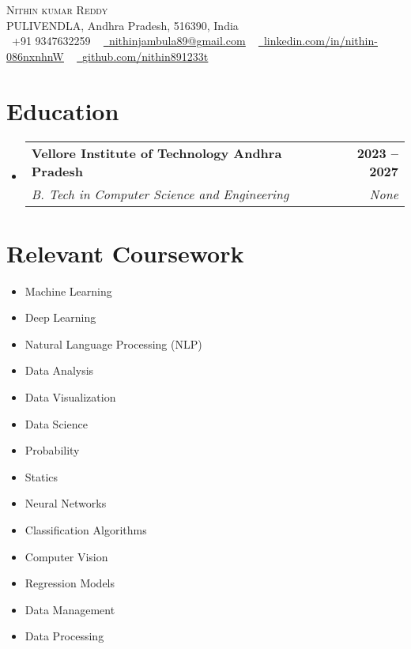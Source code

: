 \documentclass[letterpaper,11pt]{article}
\makeatletter
\newcommand{\resumeSubheading}[4]{
  \vspace{-2pt}\item
    \begin{tabular*}{1.0\textwidth}[t]{l@{\extracolsep{\fill}}r}
      \textbf{#1} & \textbf{\small #2} \\
      \textit{\small#3} & \textit{\small #4} \\
    \end{tabular*}\vspace{-7pt}
}
\newcommand{\resumeSubHeadingListStart}{\begin{itemize}[leftmargin=0.0in, label={}]}
\newcommand{\resumeSubHeadingListEnd}{\end{itemize}}
\makeatother
\begin{document}
\begin{center}
    {\Huge \scshape Nithin kumar Reddy} \\ \vspace{1pt}
    PULIVENDLA, Andhra Pradesh, 516390, India \\ \vspace{1pt}
    \small \raisebox{-0.1\height}\faPhone\ +91 9347632259 ~ \href{mailto:nithinjambula89@gmail.com}{\raisebox{-0.2\height}\faEnvelope\  \underline{nithinjambula89@gmail.com}} ~ 
    \href{https://www.linkedin.com/in/nithin-086nxnhnW}{\raisebox{-0.2\height}\faLinkedin\ \underline{linkedin.com/in/nithin-086nxnhnW}}  ~
    \href{https://github.com/nithin891233t}{\raisebox{-0.2\height}\faGithub\ \underline{github.com/nithin891233t}}
    \vspace{-8pt}
\end{center}

\section{Education}
  \resumeSubHeadingListStart
    \resumeSubheading
      {Vellore Institute of Technology Andhra Pradesh}{2023 -- 2027}
      {B. Tech in Computer Science and Engineering}{None}
  \resumeSubHeadingListEnd



\section{Relevant Coursework}
    \begin{multicols}{4}
        \begin{itemize}[itemsep=-5pt, parsep=3pt]
            \item\small Machine Learning
            \item\small Deep Learning
            \item\small Natural Language Processing (NLP)
            \item\small Data Analysis
            \item\small Data Visualization
            \item\small Data Science
            \item\small Probability
            \item\small Statics
            \item\small Neural Networks
            \item\small Classification Algorithms
            \item\small Computer Vision
            \item\small Regression Models
            \item\small Data Management
            \item\small Data Processing
        \end{itemize}
    \end{multicols}
    \vspace*{2.0\multicolsep}
\end{document}
